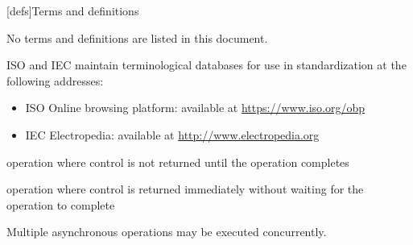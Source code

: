 
[defs]{Terms and definitions}

\setcounter{section}{1}
\setcounter{tocdepth}{0}

\setcounter{tocdepth}{1}

No terms and definitions are listed in this document.

ISO and IEC maintain terminological databases for use in standardization at
the following addresses:
\begin{itemize}
    \item ISO Online browsing platform: available at \url{https://www.iso.org/obp}
    \item IEC Electropedia: available at \url{http://www.electropedia.org}
\end{itemize}

%
operation where control is not returned until the operation completes

%
operation where control is returned immediately without waiting for the operation to complete
  
\enternote
Multiple asynchronous operations may be executed concurrently.
\exitnote

